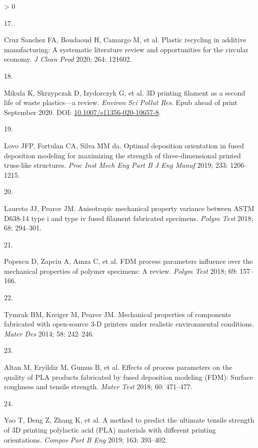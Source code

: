 \documentclass[
  12pt]{article}
\newlength{\cslhangindent}
\newlength{\csllabelwidth}
\newenvironment{CSLReferences}[2] %
 {%
  \setlength{\parindent}{0pt}
  \ifodd #1 \everypar{\setlength{\hangindent}{\cslhangindent}}\ignorespaces\fi
  \ifnum #2 > 0
  \setlength{\parskip}{#2\baselineskip}
  \fi
 }%
 {}
\newcommand{\CSLLeftMargin}[1]{\parbox[t]{\csllabelwidth}{#1}}
\newcommand{\CSLRightInline}[1]{\parbox[t]{\linewidth - \csllabelwidth}{#1}\break}
\begin{document}
\begin{CSLReferences}{0}{0}
\leavevmode\hypertarget{ref-CruzSanchez2020}{}%
\CSLLeftMargin{17. }
\CSLRightInline{Cruz Sanchez FA, Boudaoud H, Camargo M, et al. {Plastic recycling in additive manufacturing: A systematic literature review and opportunities for the circular economy}. \emph{J Clean Prod} 2020; 264: 121602.}

\leavevmode\hypertarget{ref-Mikula2020}{}%
\CSLLeftMargin{18. }
\CSLRightInline{Mikula K, Skrzypczak D, Izydorczyk G, et al. {3D printing filament as a second life of waste plastics---a review}. \emph{Environ Sci Pollut Res}. Epub ahead of print September 2020. DOI: \href{https://doi.org/10.1007/s11356-020-10657-8}{10.1007/s11356-020-10657-8}.}

\leavevmode\hypertarget{ref-Lovo2018}{}%
\CSLLeftMargin{19. }
\CSLRightInline{Lovo JFP, Fortulan CA, Silva MM da. {Optimal deposition orientation in fused deposition modeling for maximizing the strength of three-dimensional printed truss-like structures}. \emph{Proc Inst Mech Eng Part B J Eng Manuf} 2019; 233: 1206--1215.}

\leavevmode\hypertarget{ref-Laureto2018}{}%
\CSLLeftMargin{20. }
\CSLRightInline{Laureto JJ, Pearce JM. {Anisotropic mechanical property variance between ASTM D638-14 type i and type iv fused filament fabricated specimens}. \emph{Polym Test} 2018; 68: 294--301.}

\leavevmode\hypertarget{ref-Popescu2018}{}%
\CSLLeftMargin{21. }
\CSLRightInline{Popescu D, Zapciu A, Amza C, et al. {FDM process parameters influence over the mechanical properties of polymer specimens: A review}. \emph{Polym Test} 2018; 69: 157--166.}

\leavevmode\hypertarget{ref-Tymrak2014a}{}%
\CSLLeftMargin{22. }
\CSLRightInline{Tymrak BM, Kreiger M, Pearce JM. {Mechanical properties of components fabricated with open-source 3-D printers under realistic environmental conditions}. \emph{Mater Des} 2014; 58: 242--246.}

\leavevmode\hypertarget{ref-Altan2018}{}%
\CSLLeftMargin{23. }
\CSLRightInline{Altan M, Eryildiz M, Gumus B, et al. {Effects of process parameters on the quality of PLA products fabricated by fused deposition modeling (FDM): Surface roughness and tensile strength}. \emph{Mater Test} 2018; 60: 471--477.}

\leavevmode\hypertarget{ref-Yao2019}{}%
\CSLLeftMargin{24. }
\CSLRightInline{Yao T, Deng Z, Zhang K, et al. {A method to predict the ultimate tensile strength of 3D printing polylactic acid (PLA) materials with different printing orientations}. \emph{Compos Part B Eng} 2019; 163: 393--402.}


\end{CSLReferences}
\end{document}

